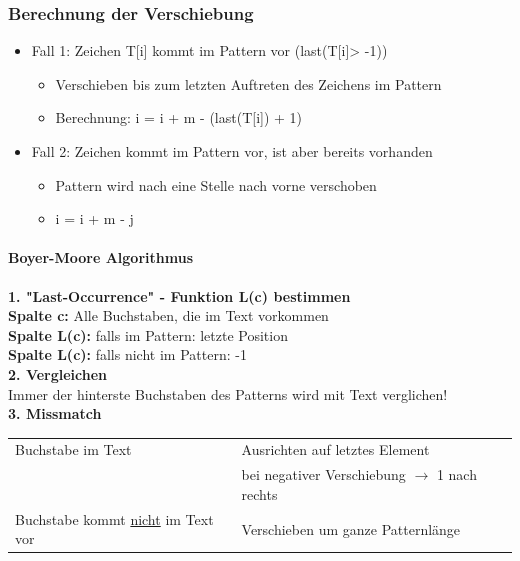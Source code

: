 \subsubsection{Berechnung der Verschiebung}

\begin{itemize}
    \item Fall 1: Zeichen T[i] kommt im Pattern vor (last(T[i]> -1))
    \begin{itemize}
        \item Verschieben bis zum letzten Auftreten des Zeichens im Pattern
        \item Berechnung: i = i + m - (last(T[i]) + 1)
    \end{itemize}
    \item Fall 2: Zeichen kommt im Pattern vor, ist aber bereits vorhanden
    \begin{itemize}
        \item Pattern wird nach eine Stelle nach vorne verschoben
        \item i = i + m - j
    \end{itemize}
\end{itemize}

\paragraph{Boyer-Moore Algorithmus}

\textbf{1. "Last-Occurrence" - Funktion L(c) bestimmen}\\

\textbf{Spalte c:} Alle Buchstaben, die im Text vorkommen\\
\textbf{Spalte L(c):} falls im Pattern: letzte Position\\ 
\textbf{Spalte L(c):} falls nicht im Pattern: -1 \\

\textbf{2. Vergleichen}\\
Immer der hinterste Buchstaben des Patterns wird mit Text verglichen!\\

\textbf{3. Missmatch}\\
\begin{tabular}[]{p{2cm} p{3.8cm}}
    Buchstabe im Text & Ausrichten auf letztes Element\\
                      & bei negativer Verschiebung $\rightarrow$ 1 nach rechts\\
    \hline
    Buchstabe kommt \underline{nicht} im Text vor & Verschieben um ganze Patternlänge
\end{tabular}

